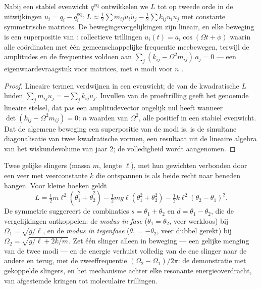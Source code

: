 \begin{proposition}\label{prop:b3:lagrangian-mechanics:modes}
Nabij een stabiel evenwicht $q^{\text{eq}}$ ontwikkelen we $L$ tot op
tweede orde in de uitwijkingen $u_i = q_i - q_i^{\text{eq}}$:
$L \approx \tfrac12\sum m_{ij}\dot u_i\dot u_j -
\tfrac12\sum k_{ij}u_iu_j$ met constante symmetrische matrices. De
bewegingsvergelijkingen zijn lineair, en elke beweging is een superpositie
van \emph{}: collectieve trillingen $u_i(t) = a_i\cos(\Omega t
+ \phi)$ waarin alle coördinaten met één gemeenschappelijke frequentie
meebewegen, terwijl de amplitudes en de frequenties voldoen aan
$\sum_j(k_{ij} -
\Omega^2m_{ij})\,a_j = 0$ --- een
eigenwaardevraagstuk voor matrices, met $n$ modi voor $n$
.
\end{proposition}

\begin{proof}
Lineaire termen verdwijnen in een evenwicht; de  van de kwadratische $L$ luiden $\sum_jm_{ij}\ddot u_j = -\sum_jk_{ij}u_j$. Invullen van de proeftrilling geeft het genoemde
lineaire stelsel, dat pas een amplitudevector ongelijk nul heeft wanneer
$\det(k_{ij} -
\Omega^2m_{ij}) = 0$: $n$ waarden van $\Omega^2$, alle
positief in een stabiel evenwicht. Dat de algemene beweging een
superpositie van de modi is, is de simultane diagonalisatie van twee
kwadratische vormen, een resultaat uit de lineaire algebra van het
wiskundevolume van jaar 2; de volledigheid wordt aangenomen.
\end{proof}

\begin{example}\label{ex:b3:lagrangian-mechanics:coupled}
Twee gelijke slingers (massa $m$, lengte $\ell$), met hun gewichten
verbonden door een veer met veerconstante $k$ die ontspannen is als beide
recht naar beneden hangen. Voor kleine hoeken geldt
\[
L = \tfrac12 m\ell^2(\dot\theta_1^2 + \dot\theta_2^2)
 - \tfrac12 mg\ell(\theta_1^2 + \theta_2^2)
 - \tfrac12 k\ell^2(\theta_2 - \theta_1)^2 .
\]
De symmetrie suggereert de combinaties $s = \theta_1 + \theta_2$ en $d =
\theta_1 - \theta_2$, die de vergelijkingen ontkoppelen: de \emph{modus in
fase} ($\theta_1 = \theta_2$, veer werkloos) bij $\Omega_1 =
\sqrt{g/\ell}$, en de \emph{modus in tegenfase} ($\theta_1 = -\theta_2$,
veer dubbel gerekt) bij $\Omega_2 = \sqrt{g/\ell + 2k/m}$. Zet één slinger
alleen in beweging --- een gelijke menging van de twee modi --- en de
energie verhuist volledig van de ene slinger naar de andere en terug, met
de zweeffrequentie $(\Omega_2 - \Omega_1)/2\pi$: de demonstratie met
gekoppelde slingers, en het mechanisme achter elke resonante
energieoverdracht, van afgestemde kringen tot moleculaire trillingen.
\end{example}

